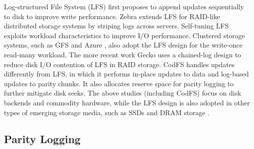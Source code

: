 Log-structured File System (LFS) \cite{rosenblum92} first proposes to append
updates sequentially to disk to improve write performance.  Zebra
\cite{hartman95} extends LFS for RAID-like distributed storage systems by
striping logs across servers.  Self-tuning LFS \cite{matthews97} exploits
workload characteristics to improve I/O performance.  Clustered storage
systems, such as GFS \cite{ghemawat03} and Azure \cite{calder11}, also adopt
the LFS design for the write-once read-many workload.  The more recent work
Gecko \cite{shin13} uses a chained-log design to reduce disk I/O contention of
LFS in RAID storage.  CodFS handles updates differently from LFS, in which it
performs in-place updates to data and log-based updates to parity chunks.  It
also allocates reserve space for parity logging to further mitigate disk
seeks.  The above studies (including CodFS) focus on disk backends and
commodity hardware, while the LFS design is also adopted in other types of
emerging storage media, such as SSDs \cite{agrawal08} and DRAM storage
\cite{ongaro11}.  



\subsection{Parity Logging}

